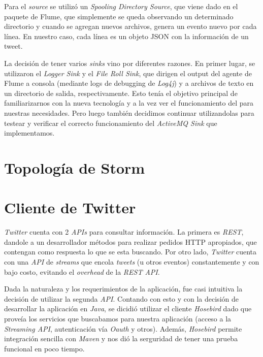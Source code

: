 \documentclass[a4paper,10pt]{article}
\begin{document}
Para el \textit{source} se utilizó un \textit{Spooling Directory Source}, que viene dado en el paquete de Flume, que simplemente se queda observando un 
determinado directorio y cuando se agregan nuevos archivos, genera un evento nuevo por cada línea. En nuestro caso, cada línea es un objeto JSON con la información de un tweet.

La decisión de tener varios \textit{sinks} vino por diferentes razones. En primer lugar, se utilizaron el \textit{Logger Sink} y el \textit{File Roll Sink}, que dirigen el output
del agente de Flume a consola (mediante logs de debugging de \textit{Log4j}) y a archivos de texto en un directorio de salida, respectivamente. Esto tenía el objetivo principal de
familiarizarnos con la nueva tecnología y a la vez ver el funcionamiento del  para nuestras necesidades. Pero luego también decidimos continuar 
utilizandolas para testear y verificar el correcto funcionamiento del \textit{ActiveMQ Sink} que implementamos.

\section{Topología de Storm}

\section{Cliente de Twitter}

\textit{Twitter} cuenta con 2 \textit{APIs} para consultar información. La primera es \textit{REST}, dandole a un desarrollador métodos para realizar pedidos HTTP apropiados, 
que contengan como respuesta lo que se esta buscando. Por otro lado, \textit{Twitter} cuenta con una \textit{API} de \textit{streams} que encola \textit{tweets} (u otros eventos) 
constantemente y con bajo costo, evitando el \textit{overhead} de la \textit{REST API}.

Dada la naturaleza y los requerimientos de la aplicación, fue casi intuitiva la decisión de utilizar la segunda \textit{API}. Contando con esto y con la decisión de desarrollar 
la aplicación en \textit{Java}, se dicidió utilizar el cliente \textit{Hosebird} dado que proveía los servicios que buscabamos para nuestra aplicación (acceso a la 
\textit{Streaming API}, autenticación vía \textit{Oauth} y otros). Además, \textit{Hosebird} permite integración sencilla con \textit{Maven} y nos dió la serguridad de tener 
una prueba funcional en poco tiempo.
\end{document}
